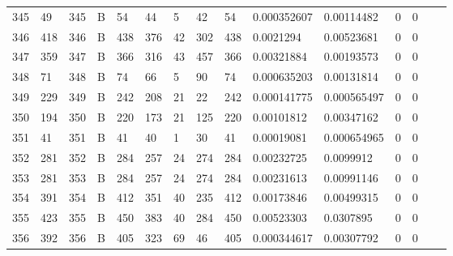 \begin{longtable}{lllllllllllllll}
	345 & 49                & 345 & B   & 54                & 44                & 5                 & 42   & 54         & 0.000352607    & 0.00114482     & 0             & 0            \\
	346 & 418               & 346 & B   & 438               & 376               & 42                & 302  & 438        & 0.0021294      & 0.00523681     & 0             & 0            \\
	347 & 359               & 347 & B   & 366               & 316               & 43                & 457  & 366        & 0.00321884     & 0.00193573     & 0             & 0            \\
	348 & 71                & 348 & B   & 74                & 66                & 5                 & 90   & 74         & 0.000635203    & 0.00131814     & 0             & 0            \\
	349 & 229               & 349 & B   & 242               & 208               & 21                & 22   & 242        & 0.000141775    & 0.000565497    & 0             & 0            \\
	350 & 194               & 350 & B   & 220               & 173               & 21                & 125  & 220        & 0.00101812     & 0.00347162     & 0             & 0            \\
	351 & 41                & 351 & B   & 41                & 40                & 1                 & 30   & 41         & 0.00019081     & 0.000654965    & 0             & 0            \\
	352 & 281               & 352 & B   & 284               & 257               & 24                & 274  & 284        & 0.00232725     & 0.0099912      & 0             & 0            \\
	353 & 281               & 353 & B   & 284               & 257               & 24                & 274  & 284        & 0.00231613     & 0.00991146     & 0             & 0            \\
	354 & 391               & 354 & B   & 412               & 351               & 40                & 235  & 412        & 0.00173846     & 0.00499315     & 0             & 0            \\
	355 & 423               & 355 & B   & 450               & 383               & 40                & 284  & 450        & 0.00523303     & 0.0307895      & 0             & 0            \\
	356 & 392               & 356 & B   & 405               & 323               & 69                & 46   & 405        & 0.000344617    & 0.00307792     & 0             & 0            \\

\end{longtable}
